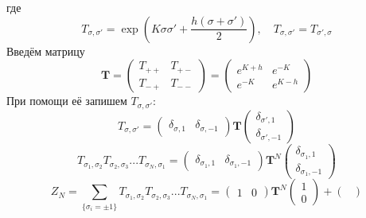 \documentclass[12pt]{article}
\theoremstyle{definition}
\begin{document}
\begin{enumerate}
\begin{itemize}
\begin{equation}
        \end{equation}
        где
        \begin{equation}
            T_{\sigma,\sigma'}=\exp\left(K\sigma\sigma'+\frac{h(\sigma+\sigma')}{2}\right),\quad T_{\sigma,\sigma'}=T_{\sigma',\sigma}
        \end{equation}
        Введём матрицу
        \begin{equation}
            \textbf{T}=\begin{pmatrix}
        T_{++} & T_{+-}\\
        T_{-+} & T_{--}
        \end{pmatrix}=\begin{pmatrix}
        e^{K+h} & e^{-K}\\
        e^{-K} & e^{K-h}
        \end{pmatrix}
        \end{equation}
        При помощи её запишем $T_{\sigma,\sigma'}$:
        \begin{equation}
            T_{\sigma,\sigma'}=\begin{pmatrix}
            \delta_{\sigma,1} & \delta_{\sigma,-1}
            \end{pmatrix}\textbf{T}\begin{pmatrix}
            \delta_{\sigma',1}\\\delta_{\sigma',-1}
            \end{pmatrix}
        \end{equation}
        \begin{equation}
            T_{\sigma_1,\sigma_2}T_{\sigma_2,\sigma_3}...T_{\sigma_N,\sigma_1}=\begin{pmatrix}
            \delta_{\sigma_1,1} & \delta_{\sigma_1,-1}
            \end{pmatrix}\textbf{T}^N\begin{pmatrix}
            \delta_{\sigma_1,1}\\\delta_{\sigma_1,-1}
            \end{pmatrix}
        \end{equation}
        \begin{equation}
            Z_N=\sum\limits_{\{\sigma_i=\pm1\}}T_{\sigma_1,\sigma_2}T_{\sigma_2,\sigma_3}...T_{\sigma_N,\sigma_1}=\begin{pmatrix}
            1 & 0
            \end{pmatrix}\textbf{T}^N\begin{pmatrix}
            1\\0
            \end{pmatrix}+\begin{pmatrix}

\end{pmatrix}
\end{equation}
\end{itemize}
\end{enumerate}
\end{document}
